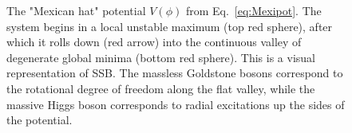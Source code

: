 \begin{figure}[t]
    \caption{The "Mexican hat" potential $V(\phi)$ from Eq.~\eqref{eq:Mexipot}. The system begins in a local unstable maximum (top red sphere), after which it rolls down (red arrow) into the continuous valley of degenerate global minima (bottom red sphere). This is a visual representation of SSB. The massless Goldstone bosons correspond to the rotational degree of freedom along the flat valley, while the massive Higgs boson corresponds to radial excitations up the sides of the potential.}
    \label{fig:mexihat}
\end{figure}

